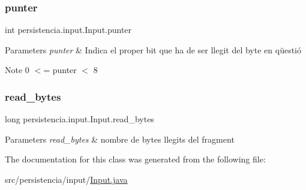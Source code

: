\subsubsection{\texorpdfstring{punter}{punter}}
{\footnotesize\ttfamily int persistencia.\+input.\+Input.\+punter\hspace{0.3cm}{\ttfamily [private]}}


\begin{DoxyParams}{Parameters}
{\em punter} & Indica el proper bit que ha de ser llegit del byte en qüestió \\
\hline
\end{DoxyParams}
\begin{DoxyNote}{Note}
0 $<$= punter $<$ 8 
\end{DoxyNote}
\mbox{\label{classpersistencia_1_1input_1_1Input_ace2c934234f82fb07ae169b50f71cd32}} 
\subsubsection{\texorpdfstring{read\+\_\+bytes}{read\_bytes}}
{\footnotesize\ttfamily long persistencia.\+input.\+Input.\+read\+\_\+bytes\hspace{0.3cm}{\ttfamily [private]}}


\begin{DoxyParams}{Parameters}
{\em read\+\_\+bytes} & nombre de bytes llegits del fragment \\
\hline
\end{DoxyParams}


The documentation for this class was generated from the following file\+:\begin{DoxyCompactItemize}
\item 
src/persistencia/input/\hyperlink{Input_8java}{Input.\+java}\end{DoxyCompactItemize}
